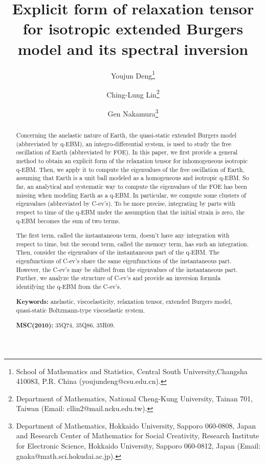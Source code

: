 \documentclass[a4paper,12pt]{article}
\newtheorem{a priori condition}[Th]{A priori condition}
\begin{document}
\title{Explicit form of relaxation tensor for isotropic extended Burgers model and its spectral inversion}

\author{
Youjun Deng\thanks{School of Mathematics and Statistics, Central South University,Changsha 410083, P.R. China (youjundeng@csu.edu.cn).}
\and
Ching-Lung Lin\thanks{Department of Mathematics, National Cheng-Kung University, Tainan 701, Taiwan (Email:
cllin2@mail.ncku.edu.tw).}
\and Gen Nakamura\thanks{Department of
Mathematics, Hokkaido University, Sapporo 060-0808, Japan and Research Center of Mathematics for Social Creativity, Research Institute for Electronic Science, Hokkaido University, Sapporo 060-0812, Japan (Email: gnaka@math.sci.hokudai.ac.jp).}}

\date{}
\maketitle

\begin{abstract}
Concerning the anelastic nature of Earth, the quasi-static extended Burgers model (abbreviated by q-EBM), an integro-differential system, is used to study the free oscillation of Earth (abbreviated by FOE). In this paper, we first provide a general method to obtain an explicit form of the relaxation tensor for inhomogeneous isotropic q-EBM. Then, we apply it to compute the eigenvalues of the free oscillation of Earth, assuming that Earth is a unit ball modeled as a homogeneous and isotropic q-EBM. So far, an analytical and systematic way to compute the eigenvalues of the FOE has been missing when modeling Earth as a q-EBM. In particular, we compute some clusters of eigenvalues (abbreviated by C-ev's). To be more precise, integrating by parts with respect to time of the q-EBM under the assumption that the initial strain is zero, the q-EBM becomes the sum of two terms. 

The first term, called the instantaneous term, doesn't have any integration with respect to time, but the second term, called the memory term, has such an integration.  Then, consider the eigenvalues of the instantaneous part of the q-EBM. The eigenfunctions of C-ev's share the same eigenfunctions of the instantaneous part. However, the C-ev's may be shifted from the eigenvalues of the instantaneous part. Further, we analyze the structure of C-ev's and provide an inversion formula identifying the q-EBM from the C-ev's. 


\bigskip

\noindent
{\bf Keywords:} anelastic, viscoelasticity, relaxation tensor, extended Burgers model, quasi-static Boltzmann-type viscoelastic system.

\noindent
{\bf MSC(2010): } 35Q74, 35Q86, 35R09.
\end{abstract}
\end{document}
